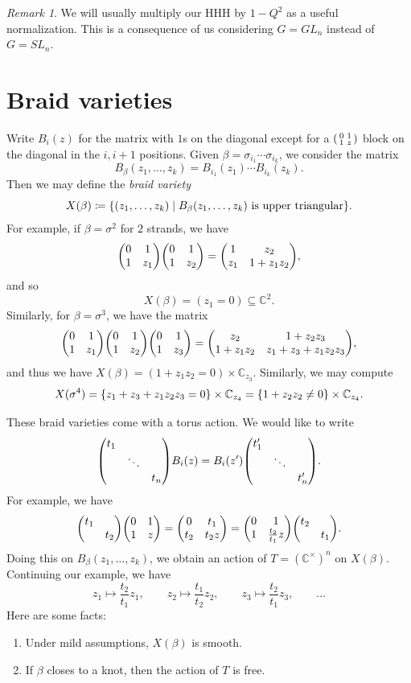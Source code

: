 \documentclass[leqno, openany]{memoir}
\theoremstyle{definition}
\theoremstyle{remark}
\newtheorem{rmk}[thm]{Remark}
\theoremstyle{plain}
\theoremstyle{definition}
\theoremstyle{remark}
\newcommand{\C}{\mathbb{C}}
\newcommand{\mr}[1]{\mathrm{#1}}
\newcommand{\1}{\mathbf{1}}
\newcommand{\2}{\mathbf{2}}
\newcommand{\3}{\mathbf{3}}
\begin{document}
\begin{rmk}
    We will usually multiply our $\mr{HHH}$ by $1-Q^2$ as a useful normalization. This is a consequence of us considering $G = GL_n$ instead of $G = SL_n$.
\end{rmk}

\section{Braid varieties}%
\label{sec:braid_varieties}

Write $B_i(z)$ for the matrix with $1$s on the diagonal except for a $\begin{psmallmatrix}
    0 & 1 \\ 1 & z
\end{psmallmatrix}$ block on the diagonal in the $i, i+1$ positions. Given $\beta = \sigma_{i_1} \cdots \sigma_{i_k}$, we consider the matrix
\[ B_{\beta}(z_1, \ldots, z_k) = B_{i_1}(z_1) \cdots B_{i_k}(z_k). \]
Then we may define the \textit{braid variety}
\[ X(\beta) \coloneqq \qty{(z_1, \ldots, z_k) \mid B_{\beta}(z_1, \ldots, z_k) \text{ is upper triangular}}. \]
For example, if $\beta = \sigma^2$ for $2$ strands, we have
\[ \mqty(0 & 1 \\ 1 & z_1) \mqty(0 & 1 \\ 1 & z_2) = \mqty(1 & z_2 \\ z_1 & 1 + z_1 z_2), \]
and so 
\[ X(\beta) = (z_1 = 0) \subseteq \C^2. \]
Similarly, for $\beta = \sigma^3$, we have the matrix
\[ \mqty(0 & 1 \\ 1 & z_1) \mqty(0 & 1 \\ 1 & z_2) \mqty(0 & 1 \\ 1 & z_3) = \mqty(z_2 & 1+z_2z_3 \\ 1 + z_1 z_2 & z_1 + z_3 + z_1 z_2 z_3), \]
and thus we have $X(\beta) = (1 + z_1 z_2 = 0) \times \C_{z_3}$. Similarly, we may compute
\[ X(\sigma^4) = \qty{z_1 + z_3 + z_1 z_2 z_3 = 0} \times \C_{z_4} = \qty{1 + z_2 z_2 \neq 0} \times \C_{z_4}. \]

These braid varieties come with a torus action. We would like to write
\[ \mqty(\dmat{t_1,\ddots,t_n}) B_i(z) = B_i(z') \mqty(\dmat{t_1',\ddots,t_n'}). \]
For example, we have
\[ \mqty(\dmat{t_1,t_2}) \mqty(0 & 1 \\ 1 & z) = \mqty(0 & t_1 \\ t_2 & t_2 z) = \mqty(0 & 1 \\ 1 & \frac{t_2}{t_1}z) \mqty(\dmat{t_2,t_1}). \]
Doing this on $B_{\beta}(z_1, \ldots, z_k)$, we obtain an action of $T = {(\C^{\times})}^n$ on $X(\beta)$. Continuing our example, we have
\[ z_1 \mapsto \frac{t_2}{t_1} z_1, \qquad z_2 \mapsto \frac{t_1}{t_2} z_2, \qquad z_3 \mapsto \frac{t_2}{t_1} z_3, \qquad\ldots \]
Here are some facts:
\begin{enumerate}
    \item Under mild assumptions, $X(\beta)$ is smooth.
    \item If $\beta$ closes to a knot, then the action of $T$ is free.
\end{enumerate}
\end{document}
